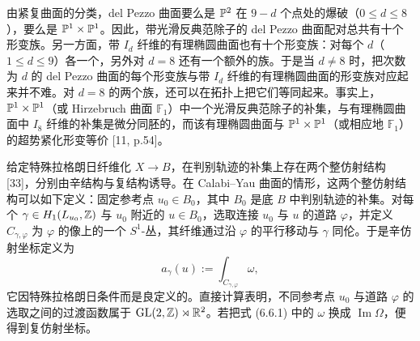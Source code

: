 由紧复曲面的分类，del Pezzo 曲面要么是 $\mathbb{P}^2$ 在 $9-d$ 个点处的爆破（$0\le d\le8$），要么是 $\mathbb{P}^1\times\mathbb{P}^1$。因此，带光滑反典范除子的 del Pezzo 曲面配对总共有十个形变族。另一方面，带 $I_d$ 纤维的有理椭圆曲面也有十个形变族：对每个 $d$（$1\le d\le9$）各一个，另外对 $d=8$ 还有一个额外的族。于是当 $d\neq8$ 时，把次数为 $d$ 的 del Pezzo 曲面的每个形变族与带 $I_d$ 纤维的有理椭圆曲面的形变族对应起来并不难。对 $d=8$ 的两个族，还可以在拓扑上把它们等同起来。事实上，$\mathbb{P}^1\times\mathbb{P}^1$（或 Hirzebruch 曲面 $\mathbb{F}_1$）中一个光滑反典范除子的补集，与有理椭圆曲面中 $I_8$ 纤维的补集是微分同胚的，而该有理椭圆曲面与 $\mathbb{P}^1\times\mathbb{P}^1$（或相应地 $\mathbb{F}_1$）的超势紧化形变等价 [11, p.54]。

给定特殊拉格朗日纤维化 $X\to B$，在判别轨迹的补集上存在两个整仿射结构 [33]，分别由辛结构与复结构诱导。在 Calabi--Yau 曲面的情形，这两个整仿射结构可以如下定义：固定参考点 $u_0\in B_0$，其中 $B_0$ 是底 $B$ 中判别轨迹的补集。对每个 $\gamma\in H_1(L_{u_0},\mathbb{Z})$ 与 $u_0$ 附近的 $u\in B_0$，选取连接 $u_0$ 与 $u$ 的道路 $\varphi$，并定义 $C_{\gamma,\varphi}$ 为 $\varphi$ 的像上的一个 $S^1$-丛，其纤维通过沿 $\varphi$ 的平行移动与 $\gamma$ 同伦。于是辛仿射坐标定义为
\begin{equation}
a_\gamma(u):=\int_{C_{\gamma,\varphi}}\omega, \tag{6.6.1}
\end{equation}
它因特殊拉格朗日条件而是良定义的。直接计算表明，不同参考点 $u_0$ 与道路 $\varphi$ 的选取之间的过渡函数属于 $\operatorname{GL}(2,\mathbb{Z})\rtimes\mathbb{R}^2$。若把式 (6.6.1) 中的 $\omega$ 换成 $\operatorname{Im}\Omega$，便得到复仿射坐标。
